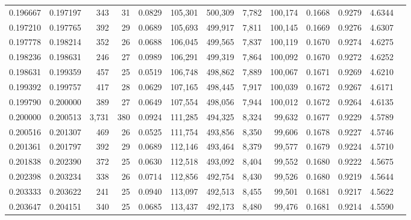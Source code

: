 \begin{tabular}{rrrrrrrrrrrrr}
0.196667 & 0.197197 &    343 &    31 &                                     0.0829 & 105,301 & 500,309 &   7,782 & 100,174 & 0.1668 & 0.9279 & 4.6344 \\
0.197210 & 0.197765 &    392 &    29 &                                     0.0689 & 105,693 & 499,917 &   7,811 & 100,145 & 0.1669 & 0.9276 & 4.6307 \\
0.197778 & 0.198214 &    352 &    26 &                                     0.0688 & 106,045 & 499,565 &   7,837 & 100,119 & 0.1670 & 0.9274 & 4.6275 \\
0.198236 & 0.198631 &    246 &    27 &                                     0.0989 & 106,291 & 499,319 &   7,864 & 100,092 & 0.1670 & 0.9272 & 4.6252 \\
0.198631 & 0.199359 &    457 &    25 &                                     0.0519 & 106,748 & 498,862 &   7,889 & 100,067 & 0.1671 & 0.9269 & 4.6210 \\
0.199392 & 0.199757 &    417 &    28 &                                     0.0629 & 107,165 & 498,445 &   7,917 & 100,039 & 0.1672 & 0.9267 & 4.6171 \\
0.199790 & 0.200000 &    389 &    27 &                                     0.0649 & 107,554 & 498,056 &   7,944 & 100,012 & 0.1672 & 0.9264 & 4.6135 \\
0.200000 & 0.200513 &  3,731 &   380 &                                     0.0924 & 111,285 & 494,325 &   8,324 &  99,632 & 0.1677 & 0.9229 & 4.5789 \\
0.200516 & 0.201307 &    469 &    26 &                                     0.0525 & 111,754 & 493,856 &   8,350 &  99,606 & 0.1678 & 0.9227 & 4.5746 \\
0.201361 & 0.201797 &    392 &    29 &                                     0.0689 & 112,146 & 493,464 &   8,379 &  99,577 & 0.1679 & 0.9224 & 4.5710 \\
0.201838 & 0.202390 &    372 &    25 &                                     0.0630 & 112,518 & 493,092 &   8,404 &  99,552 & 0.1680 & 0.9222 & 4.5675 \\
0.202398 & 0.203234 &    338 &    26 &                                     0.0714 & 112,856 & 492,754 &   8,430 &  99,526 & 0.1680 & 0.9219 & 4.5644 \\
0.203333 & 0.203622 &    241 &    25 &                                     0.0940 & 113,097 & 492,513 &   8,455 &  99,501 & 0.1681 & 0.9217 & 4.5622 \\
0.203647 & 0.204151 &    340 &    25 &                                     0.0685 & 113,437 & 492,173 &   8,480 &  99,476 & 0.1681 & 0.9214 & 4.5590 \\

\end{tabular}

